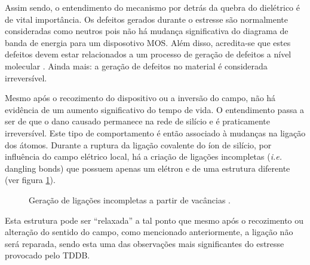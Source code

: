 Assim sendo, o entendimento do mecanismo por detr\'{a}s da quebra do diel\'{e}trico é de vital importância. Os defeitos gerados durante o estresse são normalmente consideradas como neutros pois não há mudança significativa do diagrama de banda de energia para um disposotivo MOS. Al\'{e}m disso, acredita-se que estes defeitos devem estar relacionados a um processo de geração de defeitos a nível molecular \cite{McPherson2012}. Ainda mais: a geraç\~{a}o de defeitos no material \'{e} considerada irrevers\'{i}vel.

Mesmo ap\'{o}s o recozimento do dispositivo ou a invers\~{a}o do campo, n\~{a}o há evid\^{e}ncia de um aumento significativo do tempo de vida. O entendimento passa a ser de que o dano causado permanece na rede de silício e é praticamente irreversível. Este tipo de comportamento é então associado à mudanças na ligação dos átomos. Durante a ruptura da ligação covalente do íon de silício, por influência do campo elétrico local, há a criação de ligações incompletas (\textit{i.e.} dangling bonds) que possuem apenas um elétron e de uma estrutura diferente (ver figura \ref{figure:mecanismos_TDDB_vacancies}).
\begin{figure}[H]
\center
{}
\hfill
{}
\caption{Geração de ligações incompletas a partir de vacâncias \cite{McPherson2012}.}
\label{figure:mecanismos_TDDB_vacancies}
\end{figure}
Esta estrutura pode ser ``relaxada'' a tal ponto que mesmo após o recozimento ou alteração do sentido do campo, como mencionado anteriormente, a ligação não será reparada, sendo esta uma das observações mais significantes do estresse provocado pelo TDDB.

